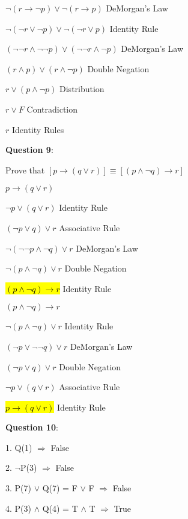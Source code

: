 \documentclass{article} %
\newcommand{\question}[2][]{\begin{flushleft}
        \textbf{Question #1}: \textit{#2}

\end{flushleft}}
\begin{document}
        \hspace*{0.05cm}

        $\neg(r \rightarrow \neg p) \lor \neg(r \rightarrow p) $ \tabto*{5cm} DeMorgan's Law

        $\neg(\neg r \lor \neg p) \lor \neg( \neg r \lor p) $ \tabto*{5cm} Identity Rule

        $(\neg \neg r \land \neg \neg p) \lor (\neg \neg r \land \neg p) $ \tabto*{5cm} DeMorgan's Law

        $(r \land p) \lor (r \land \neg p)$ \tabto*{5cm} Double Negation \hspace*{2cm}

        $r \lor (p \land \neg p)$ \tabto*{5cm} Distribution

        $r \lor F$ \tabto*{5cm} Contradiction

        $r$ \tabto*{5cm} Identity Rules

    \question[9]{}

        Prove that $[p \rightarrow (q \lor r)] \equiv [(p \land \neg q) \rightarrow r]$

        \hspace{0cm}

        $p \rightarrow (q \lor r)$

        $\neg p \lor (q \lor r)$ \tabto*{3.5cm} Identity Rule
        
        $(\neg p \lor q) \lor r$ \tabto*{3.5cm} Associative Rule

        $\neg (\neg \neg p \land \neg q) \lor r$ \tabto*{3.5cm} DeMorgan's Law

        $\neg (p \land \neg q) \lor r$ \tabto*{3.5cm} Double Negation

        \hl{$(p \land \neg q) \rightarrow r$} \tabto*{3.5cm} Identity Rule

        \hspace{0cm}

        $(p \land \neg q) \rightarrow r$

        $\neg(p \land \neg q) \lor r$ \tabto*{3.5cm} Identity Rule

        $(\neg p \lor \neg \neg q) \lor r$ \tabto*{3.5cm} DeMorgan's Law

        $(\neg p \lor q) \lor r$ \tabto*{3.5cm} Double Negation

        $\neg p \lor (q \lor r)$ \tabto*{3.5cm} Associative Rule

        \hl{$p \rightarrow (q \lor r)$} \tabto*{3.5cm} Identity Rule

    \question[10]{}

        1. Q(1) $\Rightarrow$ False

        2. $\neg$P(3) $\Rightarrow$ False

        3. P(7) $\lor$ Q(7) = F $\lor$ F $\Rightarrow$ False

        4. P(3) $\land$ Q(4) = T $\land$ T $\Rightarrow$ True
\end{document}
